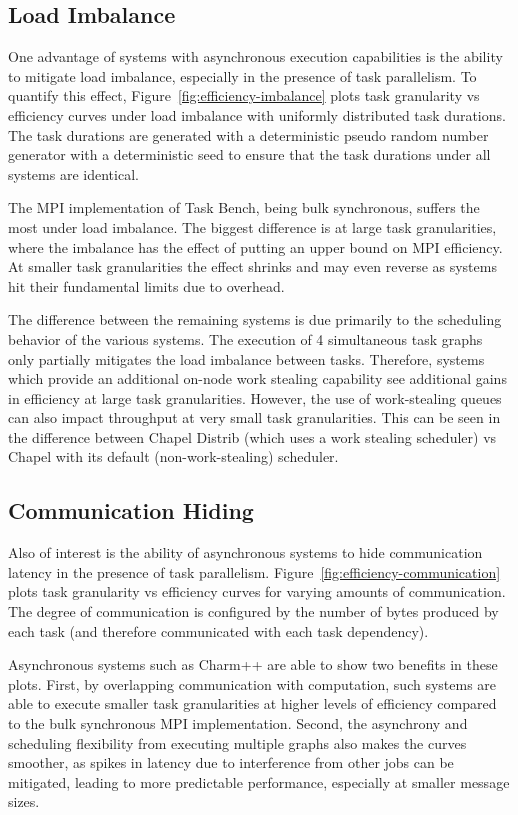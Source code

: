 \subsection{Load Imbalance}



One advantage of systems with asynchronous execution capabilities is
the ability to mitigate load imbalance, especially in the presence of
task parallelism. To quantify this effect,
Figure~\ref{fig:efficiency-imbalance} plots task granularity vs
efficiency curves under load imbalance with uniformly distributed task
durations. The task durations are generated with a deterministic
pseudo random number generator with a deterministic seed to ensure
that the task durations under all systems are identical.

The MPI implementation of Task Bench, being bulk synchronous,
suffers the most under load imbalance. The biggest
difference is at large task granularities, where the imbalance has the
effect of putting an upper bound on MPI efficiency. At smaller task
granularities the effect shrinks and may even reverse as systems hit
their fundamental limits due to overhead.

The difference between the remaining systems is due primarily to the
scheduling behavior of the various systems. The execution of 4
simultaneous task graphs only partially mitigates the
load imbalance between tasks. Therefore, systems which provide an
additional on-node work stealing capability see additional gains in
efficiency at large task granularities. However, the use of
work-stealing queues can also impact throughput at very small task
granularities. This can be seen in the difference between Chapel
Distrib (which uses a work stealing scheduler) vs Chapel with its
default (non-work-stealing) scheduler.

\subsection{Communication Hiding}



Also of interest is the ability of asynchronous systems to
hide communication latency in the presence of task
parallelism. Figure~\ref{fig:efficiency-communication} plots task
granularity vs efficiency curves for varying amounts of
communication. The degree of communication is configured by the number
of bytes produced by each task (and therefore communicated with each
task dependency).

Asynchronous systems such as Charm++ are able to show two benefits in
these plots. First, by overlapping communication with computation,
such systems are able to execute smaller task granularities at higher
levels of efficiency compared to the bulk synchronous MPI
implementation. Second, the asynchrony and scheduling flexibility from
executing multiple graphs also makes the curves smoother,
as spikes in latency due to interference from other jobs can be
mitigated, leading to more predictable performance, especially at
smaller message sizes.
